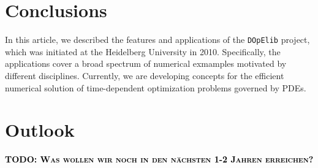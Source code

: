 \documentclass[prodmode,acmtoms]{acmsmall}
\numberwithin{equation}{section}
\newcommand{\dope}{\texttt{DOpElib}}
\newcommand{\todo}[1]{\textbf{\textsc{\textcolor{black}{TODO: #1}}}}
\begin{document}
\section{Conclusions}
\label{conclusions}
In this article, we described the features 
and applications of the \dope{} project, which 
was initiated at the Heidelberg University in 2010.
Specifically, the applications cover a broad 
spectrum of numerical exmamples motivated 
by different disciplines. 
Currently, we are developing concepts for the efficient 
numerical solution of time-dependent optimization
problems governed by PDEs. 

\section{Outlook}
\todo{Was wollen wir noch in den nächsten 1-2 Jahren erreichen?}

%


%
\end{document}
